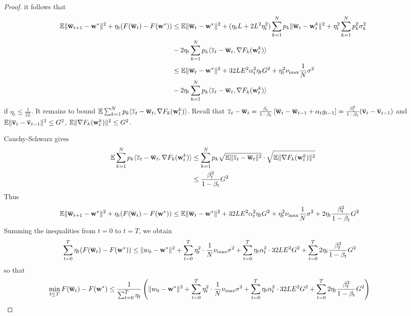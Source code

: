 \begin{proof}
	it follows that 
	\begin{align*}
	\mathbb{E}\|{\overline{\mathbf{w}}}_{t+1}-{\mathbf{w}}^{\ast}\|^{2}+\eta_{t}(F({\overline{\mathbf{w}}}_{t})-F({\mathbf{w}}^{\ast})) & \leq\mathbb{E}\|{\overline{\mathbf{w}}}_{t}-{\mathbf{w}}^{\ast}\|^{2}+(\eta_{t}L+2L^{2}\eta_{t}^{2})\sum_{k=1}^{N}p_{k}\|{\overline{\mathbf{w}}}_{t}-{\mathbf{w}}_{t}^{k}\|^{2}+\eta_{t}^{2}\sum_{k=1}^{N}p_{k}^{2}\sigma_{k}^{2}\\
	& -2\eta_{t}\sum_{k=1}^{N}p_{k}\langle\overline{z}_{t}-{\overline{\mathbf{w}}}_{t},\nabla F_{k}({\mathbf{w}}_{t}^{k})\rangle\\
	& \leq\mathbb{E}\|{\overline{\mathbf{w}}}_{t}-{\mathbf{w}}^{\ast}\|^{2}+32LE^{2}\alpha_{t}^{2}\eta_{t}G^{2}+\eta_{t}^{2}\nu_{\max}\frac{1}{N}\sigma^{2}\\
	& -2\eta_{t}\sum_{k=1}^{N}p_{k}\langle\overline{z}_{t}-{\overline{\mathbf{w}}}_{t},\nabla F_{k}({\mathbf{w}}_{t}^{k})\rangle
	\end{align*}
	if $\eta_{t}\leq\frac{1}{2L}$. It remains to bound $\mathbb{E}\sum_{k=1}^{N}p_{k}\langle\overline{z}_{t}-{\overline{\mathbf{w}}}_{t},\nabla F_{k}({\mathbf{w}}_{t}^{k})\rangle$.
	Recall that $\overline{z}_{t}-{\overline{\mathbf{w}}}_{t}=\frac{\beta_{t}}{1-\beta_{t}}\left[{\overline{\mathbf{w}}}_{t}-{\overline{\mathbf{w}}}_{t-1}+\alpha_{t}g_{t-1}\right]=\frac{\beta_{t}^{2}}{1-\beta_{t}}({\overline{\mathbf{v}}}_{t}-{\overline{\mathbf{v}}}_{t-1})$
	and $\mathbb{E}\|{\overline{\mathbf{v}}}_{t}-{\overline{\mathbf{v}}}_{t-1}\|^{2}\leq G^{2}$,
	$\mathbb{E}\|\nabla F_{k}({\mathbf{w}}_{t}^{k})\|^{2}\leq G^{2}$. 
	
	Cauchy-Schwarz gives
	\begin{align*}
	\mathbb{E}\sum_{k=1}^{N}p_{k}\langle\overline{z}_{t}-{\overline{\mathbf{w}}}_{t},\nabla F_{k}({\mathbf{w}}_{t}^{k})\rangle & \leq\sum_{k=1}^{N}p_{k}\sqrt{\mathbb{E}\|\overline{z}_{t}-{\overline{\mathbf{w}}}_{t}\|^{2}}\cdot\sqrt{\mathbb{E}\|\nabla F_{k}({\mathbf{w}}_{t}^{k})\|^{2}}\\
	& \leq\frac{\beta_{t}^{2}}{1-\beta_{t}}G^{2}
	\end{align*}
	Thus 
	\begin{align*}
	\mathbb{E}\|{\overline{\mathbf{w}}}_{t+1}-{\mathbf{w}}^{\ast}\|^{2}+\eta_{t}(F({\overline{\mathbf{w}}}_{t})-F({\mathbf{w}}^{\ast})) & \leq\mathbb{E}\|{\overline{\mathbf{w}}}_{t}-{\mathbf{w}}^{\ast}\|^{2}+32LE^{2}\alpha_{t}^{2}\eta_{t}G^{2}+\eta_{t}^{2}\nu_{\max}\frac{1}{N}\sigma^{2}+2\eta_{t}\frac{\beta_{t}^{2}}{1-\beta_{t}}G^{2}
	\end{align*}
	Summing the inequalities from $t=0$ to $t=T$, we obtain 
	\begin{align*}
	\sum_{t=0}^{T}\eta_{t}(F({\overline{\mathbf{w}}}_{t})-F({\mathbf{w}}^{\ast})) & \leq\|w_{0}-{\mathbf{w}}^{\ast}\|^{2}+\sum_{t=0}^{T}\eta_{t}^{2}\cdot\frac{1}{N}\nu_{\max}\sigma^{2}+\sum_{t=0}^{T}\eta_{t}\alpha_{t}^{2}\cdot32LE^{2}G^{2}+\sum_{t=0}^{T}2\eta_{t}\frac{\beta_{t}^{2}}{1-\beta_{t}}G^{2}
	\end{align*}
	so that
	\begin{align*}
	\min_{t\leq T}F({\overline{\mathbf{w}}}_{t})-F({\mathbf{w}}^{\ast}) & \leq\frac{1}{\sum_{t=0}^{T}\eta_{t}}\left(\|w_{0}-{\mathbf{w}}^{\ast}\|^{2}+\sum_{t=0}^{T}\eta_{t}^{2}\cdot\frac{1}{N}\nu_{\max}\sigma^{2}+\sum_{t=0}^{T}\eta_{t}\alpha_{t}^{2}\cdot32LE^{2}G^{2}+\sum_{t=0}^{T}2\eta_{t}\frac{\beta_{t}^{2}}{1-\beta_{t}}G^{2}\right)
	\end{align*}
	

\end{proof}
